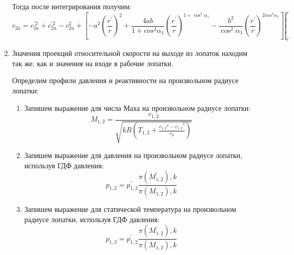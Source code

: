 \begin{enumerate}
	Тогда после интегрирования получим:
		$$
			c_{2a} = c_{2a}^{\prime 2} + c_{2u}^{\prime 2} - c_{2u}^{2} + 
			\left. \left[ 
				- a^2 \left( 
					\frac{r^\prime}{r} 
				\right)^{2} + 
				\frac{4ab}{
					1 + cos^2 \alpha_1
				}\left( 
					\frac{r^\prime}{r} 
				\right)^{1 + \cos^2\alpha_1} - 
				\frac{b^2}{\cos^2 \alpha_1} \left( 
					\frac{r^\prime}{r} 
				\right)^{2cos^2 \alpha_1}
			\right] \right|_{r^\prime}^r
		$$

	\item Значения проекций относительной скорости на выходе из лопаток находим так же, как и значения на входе в рабочие лопатки.

	Определим профили давления и реактивности на произвольном радиусе лопатки:
	\begin{enumerate}
		\item Запишем выражение для числа Маха на произвольном радиусе лопатки:
		$$
			M_{1, 2} = \frac{
				c_{1,2}
			}{
				\sqrt{kR \left( T_{1, 2} + \frac{{c_{1,2}}^2 - {c_{1,2}^\prime}^2}{c_p} \right)}
			}
		$$
		\item Запишем выражение для давления на произвольном радиусе лопатки, используя ГДФ давления:
		$$
			p_{1,2} = p_{1,2}^\prime \frac{
				\pi(M_{1,2}^\prime), k
			}{
				\pi(M_{1,2}), k
			}
		$$
		\item Запишем выражение для статической температура на произвольном радиусе лопатки, используя ГДФ давления:
		$$
			p_{1,2} = p_{1,2}^\prime \frac{
				\pi(M_{1,2}^\prime), k
			}{
				\pi(M_{1,2}), k
			}
		$$
	\end{enumerate}


\end{enumerate}